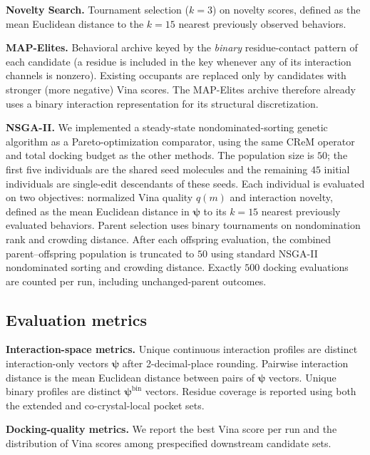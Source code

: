 \documentclass[journal=jcisd8,manuscript=article]{achemso}
\begin{document}
\textbf{Novelty Search.}\cite{lehman2011novelty} Tournament selection ($k = 3$) on novelty scores, defined as the mean Euclidean distance to the $k = 15$ nearest previously observed behaviors.

\textbf{MAP-Elites.}\cite{mouret2015illuminating} Behavioral archive keyed by the \emph{binary} residue-contact pattern of each candidate (a residue is included in the key whenever any of its interaction channels is nonzero). Existing occupants are replaced only by candidates with stronger (more negative) Vina scores. The MAP-Elites archive therefore already uses a binary interaction representation for its structural discretization.

\textbf{NSGA-II.}\cite{deb2002nsga2,garciagodoy2015docking,lopezcamacho2020flexible} We implemented a steady-state nondominated-sorting genetic algorithm as a Pareto-optimization comparator, using the same CReM operator and total docking budget as the other methods. The population size is $50$; the first five individuals are the shared seed molecules and the remaining $45$ initial individuals are single-edit descendants of these seeds. Each individual is evaluated on two objectives: normalized Vina quality $q(m)$ and interaction novelty, defined as the mean Euclidean distance in $\boldsymbol{\psi}$ to its $k = 15$ nearest previously evaluated behaviors. Parent selection uses binary tournaments on nondomination rank and crowding distance. After each offspring evaluation, the combined parent--offspring population is truncated to $50$ using standard NSGA-II nondominated sorting and crowding distance. Exactly $500$ docking evaluations are counted per run, including unchanged-parent outcomes.

\subsection{Evaluation metrics}

\textbf{Interaction-space metrics.} Unique continuous interaction profiles are distinct interaction-only vectors $\boldsymbol{\psi}$ after 2-decimal-place rounding. Pairwise interaction distance is the mean Euclidean distance between pairs of $\boldsymbol{\psi}$ vectors. Unique binary profiles are distinct $\boldsymbol{\psi}^{\mathrm{bin}}$ vectors. Residue coverage is reported using both the extended and co-crystal-local pocket sets.

\textbf{Docking-quality metrics.} We report the best Vina score per run and the distribution of Vina scores among prespecified downstream candidate sets.
\end{document}
